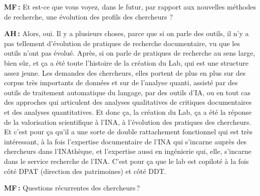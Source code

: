 \textbf{MF :} Et est-ce que vous voyez, dans le futur, par rapport aux nouvelles méthodes de recherche, une évolution des profils des chercheurs ? 

\textbf{AH :} Alors, oui. Il y a plusieurs choses, parce que si on parle des outils, il n'y a pas tellement d'évolution de pratiques de recherche documentaire, vu que les outils n'ont pas évolué.  Après, si on parle de pratiques de recherche au sens large, bien sûr, et ça a été toute l'histoire de la création du Lab, qui est une structure assez jeune. Les demandes des chercheurs, elles portent de plus en plus sur des corpus très importants de données et sur de l'analyse quanti, assisté par des outils de traitement automatique du langage, par des outils d'IA, ou en tout cas des approches qui articulent des analyses qualitatives de critiques documentaires et des analyses quantitatives. Et donc ça, la création du Lab, ça a été la réponse de la valorisation scientifique à l’INA, à l'évolution des pratiques des chercheurs. Et c'est pour ça qu'il a une sorte de double rattachement fonctionnel qui est très intéressant, à la fois l'expertise documentaire de l'INA qui s'incarne auprès des chercheurs dans l'INAthèque, et l'expertise aussi en ingénierie qui, elle, s'incarne dans le service recherche de l'INA. C'est pour ça que le lab est copiloté à la fois côté DPAT (direction des patrimoines) et côté DDT.

\textbf{MF :} Questions récurrentes des chercheurs ? 

